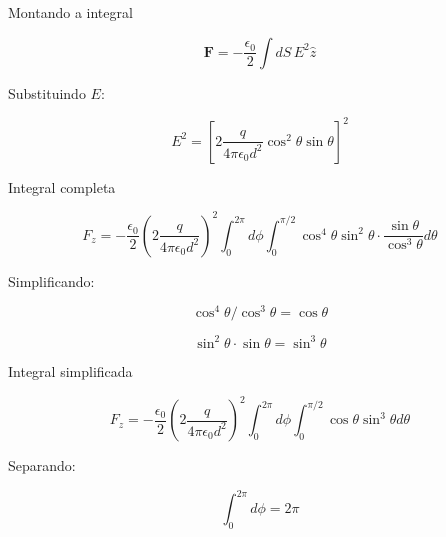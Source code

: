 \documentclass[aspectratio=169,11pt]{beamer}
\begin{document}
\begin{frame}{Montando a integral}

\begin{eqbox}
\begin{equation}
\mathbf F =
-\frac{\epsilon_0}{2}
\int dS\, E^2 \hat z
\end{equation}
\end{eqbox}

Substituindo $E$:

\begin{eqbox}
\begin{equation}
E^2 =
\left[
2 \frac{q}{4\pi\epsilon_0 d^2}
\cos^2\theta \sin\theta
\right]^2
\end{equation}
\end{eqbox}

\end{frame}

\begin{frame}{Integral completa}

\begin{eqbox}
\begin{equation}
F_z =
-\frac{\epsilon_0}{2}
\left(
2 \frac{q}{4\pi\epsilon_0 d^2}
\right)^2
\int_0^{2\pi} d\phi
\int_0^{\pi/2}
\cos^4\theta \sin^2\theta
\cdot
\frac{\sin\theta}{\cos^3\theta}
d\theta
\end{equation}
\end{eqbox}

Simplificando:

\[
\cos^4\theta / \cos^3\theta = \cos\theta
\]

\[
\sin^2\theta \cdot \sin\theta = \sin^3\theta
\]

\end{frame}

\begin{frame}{Integral simplificada}

\begin{eqbox}
\begin{equation}
F_z =
-\frac{\epsilon_0}{2}
\left(
2 \frac{q}{4\pi\epsilon_0 d^2}
\right)^2
\int_0^{2\pi} d\phi
\int_0^{\pi/2}
\cos\theta \sin^3\theta d\theta
\end{equation}
\end{eqbox}

Separando:

\[
\int_0^{2\pi} d\phi = 2\pi
\]

\end{frame}
\end{document}

